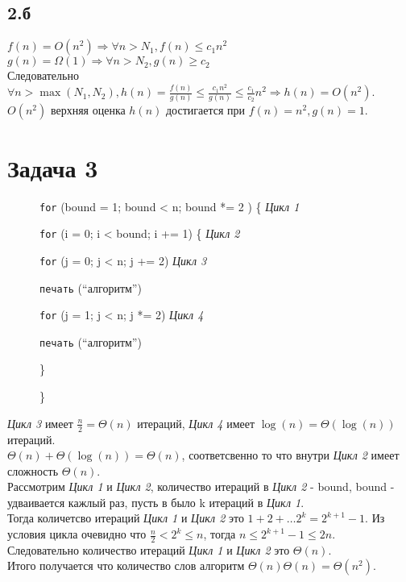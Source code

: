 \documentclass[12pt]{exam}
\begin{document}
\subsection*{2.б}

$f(n) = O(n^2) \Rightarrow \forall n > N_1, f(n) \leq c_1 n^2$ \\
$g(n) = \Omega(1) \Rightarrow \forall n > N_2, g(n) \geq c_2 $ \\
Следовательно $\forall n > \max(N_1, N_2), h(n) = \frac{f(n)}{g(n)}\leq \frac{c_1 n^2}{g(n)} \leq \frac{c_1}{c_2} n^2 \Rightarrow h(n) = O(n^2)$.\\
$O(n^2)$ верхняя оценка $h(n)$ достигается при $f(n) = n^2, g(n) = 1$.

\section*{Задача 3}
\begin{figure}[h]

    {\tt for} (bound = 1; bound < n; bound *= 2 ) \{ \emph{Цикл 1}

        \hspace{4mm} {\tt for} (i = 0; i < bound; i += 1) \{ \emph{Цикл 2}

        \hspace{8mm} {\tt for} (j = 0; j < n; j += 2) \emph{Цикл 3}

        \hspace{12mm} {\tt печать} (``алгоритм'')

        \hspace{8mm} {\tt for} (j = 1; j < n; j *= 2) \emph{Цикл 4}

        \hspace{12mm} {\tt печать} (``алгоритм'')

        \hspace{4mm} \}

    \} 
\end{figure}

\emph{Цикл 3} имеет $\frac{n}{2} = \Theta(n)$ итераций, \emph{Цикл 4} имеет $\log(n) = \Theta(\log(n))$ итераций.\\
$\Theta(n) + \Theta(\log(n)) = \Theta(n)$, соответсвенно то что внутри \emph{Цикл 2} имеет сложность $\Theta(n)$.\\

Рассмотрим \emph{Цикл 1} и \emph{Цикл 2}, количество итераций в \emph{Цикл 2} - bound, bound - удваивается кажлый раз, пусть в было k итераций в \emph{Цикл 1}.\\
Тогда количетсво итераций \emph{Цикл 1} и \emph{Цикл 2} это $1 + 2 + \ldots 2^k = 2^{k + 1} - 1$.
Из условия цикла очевидно что $\frac{n}{2} < 2^k \leq n$,
тогда $ n \leq 2^{k + 1} - 1 \leq 2n$. \\
Следовательно количество итераций \emph{Цикл 1} и \emph{Цикл 2} это $\Theta(n)$. \\
Итого получается что количество слов алгоритм $\Theta(n) \Theta(n) = \Theta(n^2)$.
\end{document}
